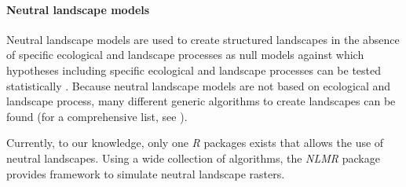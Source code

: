 \documentclass[smallextended]{svjour3}       %
\begin{document}
\hypertarget{sec:NLM}{%
\paragraph{Neutral landscape models}\label{sec:NLM}}

Neutral landscape models are used to create structured landscapes in the absence of specific ecological and landscape processes as null models against which hypotheses including specific ecological and landscape processes can be tested statistically \cite{Gardner1987,With1997}.
Because neutral landscape models are not based on ecological and landscape process, many different generic algorithms to create landscapes can be found (for a comprehensive list, see \cite{Sciaini2018}).

Currently, to our knowledge, only one \emph{R} packages exists that allows the use of neutral landscapes.
Using a wide collection of algorithms, the \emph{NLMR} package \cite{Sciaini2018} provides framework to simulate neutral landscape rasters.
\end{document}
